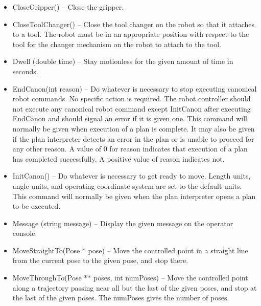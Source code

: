 \begin{itemize}

\item \sf CloseGripper() \rm -- Close the gripper.\\

\item \sf CloseToolChanger() \rm -- Close the tool changer on the robot so
  that it attaches to a tool. The robot must be in an appropriate position
  with respect to the tool for the changer mechanism on the robot to attach
  to the tool.\\

\item \sf Dwell (double time) \rm -- Stay motionless for the given amount
  of \sf time \rm in seconds.\\

\item \sf EndCanon(int reason) \rm -- Do whatever is necessary to stop
  executing canonical robot commands. No specific action is required. The
  robot controller should not execute any canonical robot command except
  \sf InitCanon \rm after executing \sf EndCanon \rm and should signal an
  error if it is given one.  This command will normally be given when
  execution of a plan is complete.  It may also be given if the plan
  interpreter detects an error in the plan or is unable to proceed for any
  other reason. A value of 0 for \sf reason \rm indicates that execution of
  a plan has completed successfully.  A positive value of reason indicates
  not.\\

\item \sf InitCanon() \rm -- Do whatever is necessary to get ready to
move. Length units, angle units, and operating coordinate system are 
set to the default units. This command
will normally be given when the plan interpreter opens a plan to be
executed.\\

\item \sf Message (string message) \rm -- Display the given \sf message \rm
  on the operator console.\\

\item \sf MoveStraightTo(Pose * pose) \rm -- Move the controlled point in a
  straight line from the current pose to the given \sf pose\rm, and stop
  there.\\

\item \sf MoveThroughTo(Pose ** poses, int numPoses) \rm -- Move the
  controlled point along a trajectory passing near all but the last of the
  given \sf poses\rm, and stop at the last of the given \sf poses\rm.
  The \sf numPoses \rm gives the number of poses.\\


\end{itemize}
